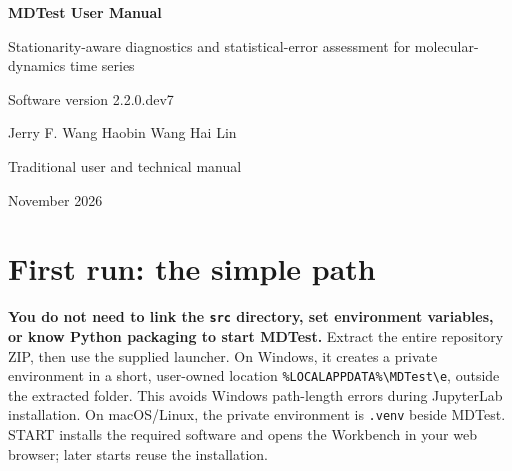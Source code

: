 \documentclass[11pt,oneside]{report}
\begin{document}
\begin{titlepage}
\centering
\vspace*{1.2in}
{\Huge\bfseries MDTest User Manual\par}
\vspace{0.25in}
{\Large Stationarity-aware diagnostics and statistical-error assessment for molecular-dynamics time series\par}
\vspace{0.5in}
{\large Software version 2.2.0.dev7\par}
\vspace{0.8in}
{\large Jerry F. Wang \quad Haobin Wang \quad Hai Lin\par}
\vfill
{\large Traditional user and technical manual\par}
\vspace{0.2in}
{\small November 2026\par}
\end{titlepage}

\tableofcontents
\clearpage

\chapter*{First run: the simple path}
\noindent\textbf{You do not need to link the \texttt{src} directory, set environment variables, or know Python packaging to start MDTest.} Extract the entire repository ZIP, then use the supplied launcher. On Windows, it creates a private environment in a short, user-owned location \texttt{\%LOCALAPPDATA\%\textbackslash MDTest\textbackslash e}, outside the extracted folder. This avoids Windows path-length errors during JupyterLab installation. On macOS/Linux, the private environment is \texttt{.venv} beside MDTest. START installs the required software and opens the Workbench in your web browser; later starts reuse the installation.
\end{document}
